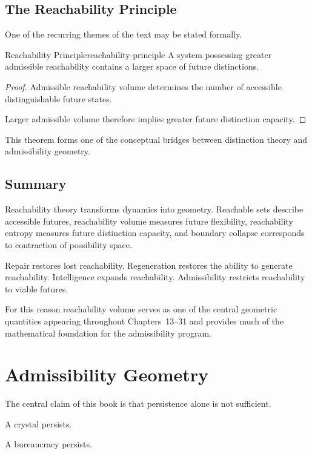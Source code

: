 \documentclass[12pt,twoside,openright]{book}
\begin{document}
\subsection{The Reachability Principle}

One of the recurring themes of the text may be stated
formally.

\begin{theorem}{Reachability Principle}{reachability-principle}
A system possessing greater admissible reachability
contains a larger space of future distinctions.
\end{theorem}

\begin{proof}
Admissible reachability volume determines the number of
accessible distinguishable future states.

Larger admissible volume therefore implies greater future
distinction capacity.
\end{proof}

This theorem forms one of the conceptual bridges between
distinction theory and admissibility geometry.

\subsection{Summary}

Reachability theory transforms dynamics into geometry.
Reachable sets describe accessible futures, reachability
volume measures future flexibility, reachability entropy
measures future distinction capacity, and boundary
collapse corresponds to contraction of possibility space.

Repair restores lost reachability. Regeneration restores
the ability to generate reachability. Intelligence
expands reachability. Admissibility restricts
reachability to viable futures.

For this reason reachability volume serves as one of the
central geometric quantities appearing throughout
Chapters~13--31 and provides much of the mathematical
foundation for the admissibility program.

\section{Admissibility Geometry}

The central claim of this book is that persistence alone
is not sufficient.

A crystal persists.

A bureaucracy persists.
\end{document}
